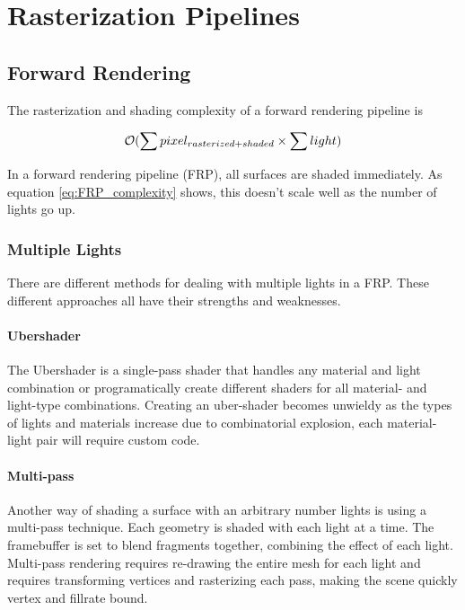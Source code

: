 \section{Rasterization Pipelines}

\subsection{Forward Rendering}

The rasterization and shading complexity of a forward rendering pipeline is

\begin{equation}\label{eq:FRP_complexity}
  \mathcal{O}(\sum {pixel_{rasterized + shaded}} \times \sum light)
\end{equation}

In a forward rendering pipeline (FRP), all surfaces are shaded immediately. As equation \eqref{eq:FRP_complexity} shows, this doesn't scale well as the number of lights go up.

\subsubsection{Multiple Lights}

There are different methods for dealing with multiple lights in a FRP. These different approaches all have their strengths and weaknesses.

\paragraph{Ubershader}

The Ubershader is a single-pass shader that handles any material and light combination or programatically create different shaders for all material- and light-type combinations. Creating an uber-shader becomes unwieldy as the types of lights and materials increase due to combinatorial explosion, each material-light pair will require custom code.

\paragraph{Multi-pass}

Another way of shading a surface with an arbitrary number lights is using a multi-pass technique. Each geometry is shaded with each light at a time. The framebuffer is set to blend fragments together, combining the effect of each light. Multi-pass rendering requires re-drawing the entire mesh for each light and requires transforming vertices and rasterizing each pass, making the scene quickly vertex and fillrate bound.

